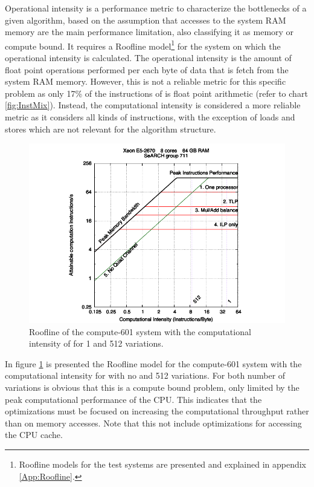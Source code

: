 Operational intensity \cite{Roofline} is a performance metric to characterize the bottlenecks of a given algorithm, based on the assumption that accesses to the system RAM memory are the main performance limitation, also classifying it as memory or compute bound. It requires a Roofline model\footnote{Roofline models for the test systems are presented and explained in appendix \ref{App:Roofline}.} for the system on which the operational intensity is calculated. The operational intensity is the amount of float point operations performed per each byte of data that is fetch from the system RAM memory. However, this is not a reliable metric for this specific problem as only 17\% of the instructions of \ttDilepKinFit is float point arithmetic (refer to chart \ref{fig:InstMix}). Instead, the computational intensity is considered a more reliable metric as it considers all kinds of instructions, with the exception of loads and stores which are not relevant for the algorithm structure.

\begin{figure}[!htp]
	\begin{center}
		\includegraphics[scale=1]{../../common/601_papi.pdf}  
		\caption{Roofline of the compute-601 system with the computational intensity of \ttDilepKinFit for 1 and 512 variations.}
		\label{fig:Roofline}
	\end{center}
\end{figure}

In figure \ref{fig:Roofline} is presented the Roofline model for the compute-601 system with the computational intensity for \ttDilepKinFit with no and 512 variations. For both number of variations is obvious that this is a compute bound problem, only limited by the peak computational performance of the CPU. This indicates that the optimizations must be focused on increasing the computational throughput rather than on memory accesses. Note that this not include optimizations for accessing the CPU cache.

